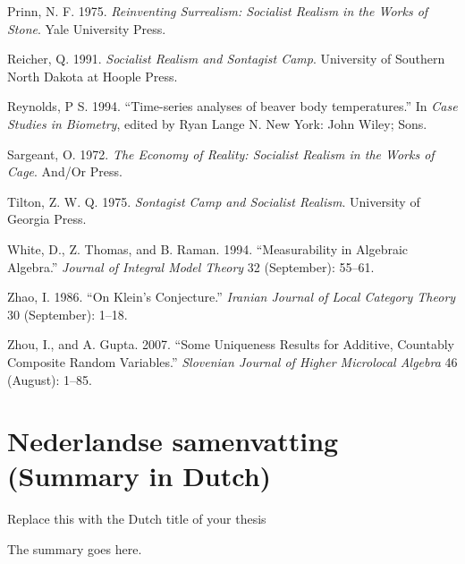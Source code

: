 \documentclass[12pt,english,a4paper,oneside,]{book} %
\newenvironment{dutch}[2][]{\begin{otherlanguage}{dutch}}{\end{otherlanguage}}
\theoremstyle{definition}
\theoremstyle{definition}
\theoremstyle{definition}
\theoremstyle{remark}
\begin{document}
\leavevmode\hypertarget{ref-Prinn1975}{}%
Prinn, N. F. 1975. \emph{Reinventing Surrealism: Socialist Realism in the Works of Stone}. Yale University Press.

\leavevmode\hypertarget{ref-Reicher1991}{}%
Reicher, Q. 1991. \emph{Socialist Realism and Sontagist Camp}. University of Southern North Dakota at Hoople Press.

\leavevmode\hypertarget{ref-Reynolds1994}{}%
Reynolds, P S. 1994. ``Time-series analyses of beaver body temperatures.'' In \emph{Case Studies in Biometry}, edited by Ryan Lange N. New York: John Wiley; Sons.

\leavevmode\hypertarget{ref-Sargeant1972}{}%
Sargeant, O. 1972. \emph{The Economy of Reality: Socialist Realism in the Works of Cage}. And/Or Press.

\leavevmode\hypertarget{ref-Tilton1975}{}%
Tilton, Z. W. Q. 1975. \emph{Sontagist Camp and Socialist Realism}. University of Georgia Press.

\leavevmode\hypertarget{ref-cite:31}{}%
White, D., Z. Thomas, and B. Raman. 1994. ``Measurability in Algebraic Algebra.'' \emph{Journal of Integral Model Theory} 32 (September): 55--61.

\leavevmode\hypertarget{ref-cite:9}{}%
Zhao, I. 1986. ``On Klein's Conjecture.'' \emph{Iranian Journal of Local Category Theory} 30 (September): 1--18.

\leavevmode\hypertarget{ref-cite:22}{}%
Zhou, I., and A. Gupta. 2007. ``Some Uniqueness Results for Additive, Countably Composite Random Variables.'' \emph{Slovenian Journal of Higher Microlocal Algebra} 46 (August): 1--85.

\endgroup

\hypertarget{nederlandse-samenvatting-summary-in-dutch}{%
\chapter*{Nederlandse samenvatting (Summary in Dutch)}\label{nederlandse-samenvatting-summary-in-dutch}}


\begin{dutch}

\emph{Replace this with the Dutch title of your thesis}

\bigskip

The summary goes here.

\end{dutch}
\end{document}

